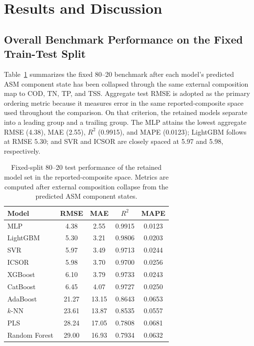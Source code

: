 \documentclass[a4paper,fleqn]{cas-sc}
\newcommand{\rev}[1]{\textcolor{revDefault}{#1}}
\newenvironment{revblock}{\begingroup\color{revDefault}}{\endgroup}
\begin{document}
\section{\rev{Results and Discussion}}
\begin{revblock}

\subsection{Overall Benchmark Performance on the Fixed Train-Test Split}

Table~\ref{tab:results_benchmark_sample} summarizes the fixed 80--20 benchmark after each model's predicted ASM component state has been collapsed through the same external composition map to COD, TN, TP, and TSS. Aggregate test RMSE is adopted as the primary ordering metric because it measures error in the same reported-composite space used throughout the comparison. On that criterion, the retained models separate into a leading group and a trailing group. The MLP attains the lowest aggregate RMSE (4.38), MAE (2.55), $R^2$ (0.9915), and MAPE (0.0123); LightGBM follows at RMSE 5.30; and SVR and ICSOR are closely spaced at 5.97 and 5.98, respectively.

\begin{table}[H]
\centering
\caption{Fixed-split 80--20 test performance of the retained model set in the reported-composite space. Metrics are computed after external composition collapse from the predicted ASM component states.}
\label{tab:results_benchmark_sample}
\scriptsize
\begin{tabular}{lcccc}
\hline
Model & RMSE & MAE & $R^2$ & MAPE \\
\hline
MLP & 4.38 & 2.55 & 0.9915 & 0.0123 \\
LightGBM & 5.30 & 3.21 & 0.9806 & 0.0203 \\
SVR & 5.97 & 3.49 & 0.9713 & 0.0244 \\
ICSOR & 5.98 & 3.70 & 0.9700 & 0.0256 \\
XGBoost & 6.10 & 3.79 & 0.9733 & 0.0243 \\
CatBoost & 6.45 & 4.07 & 0.9727 & 0.0250 \\
AdaBoost & 21.27 & 13.15 & 0.8643 & 0.0653 \\
$k$-NN & 23.61 & 13.87 & 0.8535 & 0.0557 \\
PLS & 28.24 & 17.05 & 0.7808 & 0.0681 \\
Random Forest & 29.00 & 16.93 & 0.7934 & 0.0632 \\
\hline
\end{tabular}
\end{table}


\end{revblock}
\end{document}
